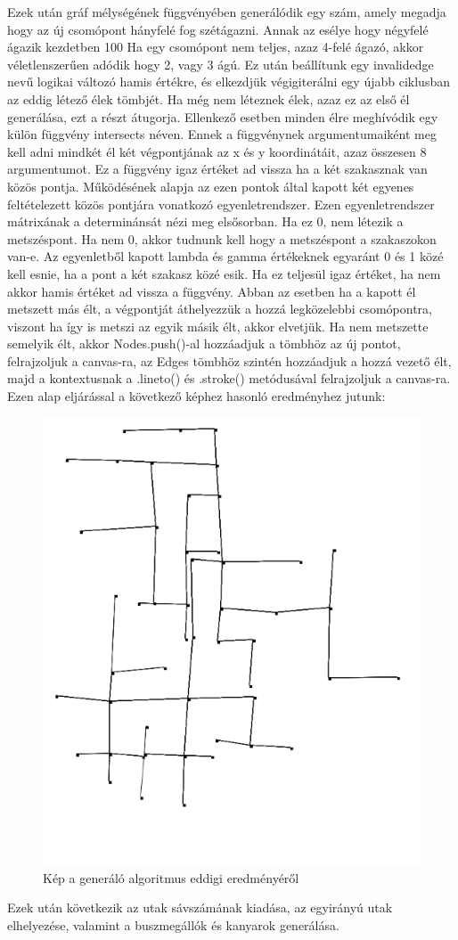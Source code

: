 Ezek után gráf mélységének függvényében generálódik egy szám, amely megadja hogy az új csomópont hányfelé fog szétágazni. Annak az esélye hogy négyfelé ágazik kezdetben 100%
Ha egy csomópont nem teljes, azaz 4-felé ágazó, akkor véletlenszerűen adódik hogy 2, vagy 3 ágú. Ez után beállítunk egy invalidedge nevű logikai változó hamis értékre, és elkezdjük végigiterálni egy újabb ciklusban az eddig létező élek tömbjét.
Ha még nem léteznek élek, azaz ez az első él generálása, ezt a részt átugorja. Ellenkező esetben minden élre meghívódik egy külön függvény intersects néven. Ennek a függvénynek argumentumaiként meg kell adni mindkét él két végpontjának az x és y koordinátáit, azaz 
összesen 8 argumentumot. Ez a függvény igaz értéket ad vissza ha a két szakasznak van közös pontja. Működésének alapja az ezen pontok által kapott két egyenes feltételezett közös pontjára vonatkozó egyenletrendszer. Ezen egyenletrendszer mátrixának a determinánsát nézi meg elsősorban. Ha ez 0, nem létezik a metszéspont. 
Ha nem 0, akkor tudnunk kell hogy a metszéspont a szakaszokon van-e. Az egyenletből kapott lambda és gamma értékeknek egyaránt 0 és 1 közé kell esnie, ha a pont a két szakasz közé esik. Ha ez teljesül igaz értéket, ha nem akkor hamis értéket ad vissza a függvény. 
Abban az esetben ha a kapott él metszett más élt, a végpontját áthelyezzük a hozzá legközelebbi csomópontra, viszont ha így is metszi az egyik másik élt, akkor elvetjük. Ha nem metszette semelyik élt, akkor Nodes.push()-al hozzáadjuk a tömbhöz az új pontot, felrajzoljuk a 
canvas-ra, az Edges tömbhöz szintén hozzáadjuk a hozzá vezető élt, majd a kontextusnak a .lineto() és .stroke() metódusával felrajzoljuk a canvas-ra.
Ezen alap eljárással a következő képhez hasonló eredményhez jutunk:

\begin{figure}[H]
\includegraphics[width=\linewidth]{graph.png}
\caption{Kép a generáló algoritmus eddigi eredményéről}
\label{fig:graph}
\end{figure}
Ezek után következik az utak sávszámának kiadása, az egyirányú utak elhelyezése, valamint a buszmegállók és kanyarok generálása.